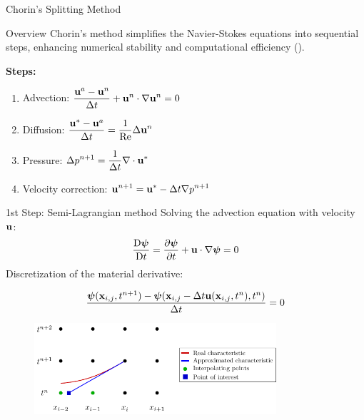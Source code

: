 \begin{frame}{Chorin's Splitting Method}

\begin{block}{Overview}
Chorin's method simplifies the Navier-Stokes equations into sequential steps, enhancing numerical stability and computational efficiency (\cite{Chorin1967NumericalNS,Boyd2001ChebyshevFourier}).
\end{block}

\textbf{Steps:}
\begin{enumerate}
    \item Advection: $\displaystyle\frac{\boldsymbol{\mathrm{u}}^a - \boldsymbol{\mathrm{u}}^n}{\Delta t} + \boldsymbol{\mathrm{u}}^n\cdot\nabla\boldsymbol{\mathrm{u}}^n = 0$
    \item Diffusion: $\displaystyle\frac{\boldsymbol{\mathrm{u}}^* - \boldsymbol{\mathrm{u}}^a}{\Delta t} = \frac{1}{\mathrm{Re}}\Delta\boldsymbol{\mathrm{u}}^n$
    \item Pressure: $\displaystyle\Delta p^{n+1} = \frac{1}{\Delta t}\nabla\cdot\boldsymbol{\mathrm{u}}^*$
    \item Velocity correction: $\displaystyle\boldsymbol{\mathrm{u}}^{n+1} = \boldsymbol{\mathrm{u}}^* - \Delta t\nabla p^{n+1}$
\end{enumerate}

\end{frame}

\begin{frame}{1st Step: Semi-Lagrangian method}
  Solving the advection equation with velocity $\boldsymbol{\mathrm{u}}$:
  \begin{equation*}
    \frac{\mathrm{D}\boldsymbol{\mathrm{\psi}}}{\mathrm{D}t}=\frac{\partial \boldsymbol{\mathrm{\psi}}}{\partial t} + \boldsymbol{\mathrm{u}}\cdot\nabla\boldsymbol{\mathrm{\psi}} = 0
  \end{equation*}
  Discretization of the material derivative:

  \begin{equation*}
    \frac{\boldsymbol{\mathrm{\psi}}(\boldsymbol{\mathrm{x}}_{i,j}, t^{n+1}) - \boldsymbol{\mathrm{\psi}}(\boldsymbol{\mathrm{x}}_{i,j} - \Delta t\boldsymbol{\mathrm{u}}(\boldsymbol{\mathrm{x}}_{i,j}, t^n), t^n)}{\Delta t} = 0
  \end{equation*}
  \begin{figure}
    \centering
    \includegraphics[width=0.8\textwidth]{graphics/characteristics.pdf}
  \end{figure}
\end{frame}

